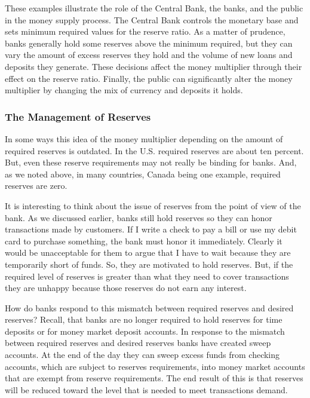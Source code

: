 \documentclass[letterpaper,12pt]{article}
\begin{document}
These examples illustrate the role of the Central Bank, the banks,
and the public in the money supply process. The Central Bank
controls the monetary base and sets minimum required values for the
reserve ratio. As a matter of prudence, banks generally hold some
reserves above the minimum required, but they can vary the amount of
excess reserves they hold and the volume of new loans and deposits
they generate. These decisions affect the money multiplier through
their effect on the reserve ratio. Finally, the public can
significantly alter the money multiplier by changing the mix of
currency and deposits it holds.

\subsubsection*{The Management of Reserves}

In some ways this idea of the money multiplier depending on the
amount of required reserves is outdated. In the U.S. required
reserves are about ten percent. But, even these reserve requirements
may not really be binding for banks. And, as we noted above, in many
countries, Canada being one example, required reserves are zero.

It is interesting to think about the issue of reserves from the
point of view of the bank. As we discussed earlier, banks still hold
reserves so they can honor transactions made by customers. If I
write a check to pay a bill or use my debit card to purchase
something, the bank must honor it immediately. Clearly it would be
unacceptable for them to argue that I have to wait because they are
temporarily short of funds. So, they are motivated to hold reserves.
But, if the required level of reserves is greater than what they
need to cover transactions they are unhappy because those reserves
do not earn any interest.

How do banks respond to this mismatch between required reserves and
desired reserves? Recall, that banks are no longer required to hold
reserves for time deposits or for money market deposit accounts. In
response to the mismatch between required reserves and desired
reserves banks have created sweep accounts. At the end of the day
they can sweep excess funds from checking accounts, which are
subject to reserves requirements, into money market accounts that
are exempt from reserve requirements. The end result of this is that
reserves will be reduced toward the level that is needed to meet
transactions demand.
\end{document}
